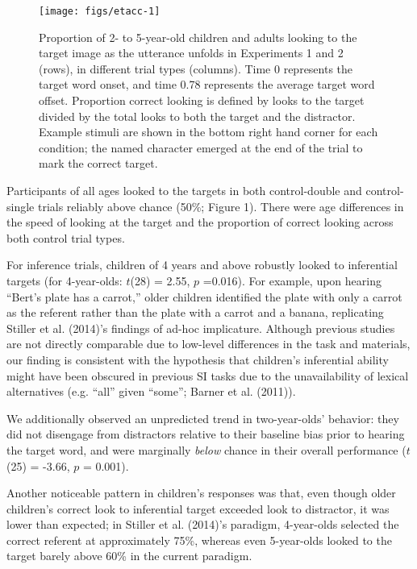 \documentclass[a4paper,man,apacite,floatsintext]{apa6}
\newenvironment{CodeChunk}{}{}
\begin{document}
\begin{CodeChunk}
\begin{figure}[H]

{\centering \texttt{[image: figs/etacc-1]} 

}

\caption[Proportion of 2- to 5-year-old children and adults looking to the target image as the utterance unfolds in Experiments 1 and 2 (rows), in different trial types (columns)]{Proportion of 2- to 5-year-old children and adults looking to the target image as the utterance unfolds in Experiments 1 and 2 (rows), in different trial types (columns). Time 0 represents the target word onset, and time 0.78 represents the average target word offset. Proportion correct looking is defined by looks to the target divided by the total looks to both the target and the distractor. Example stimuli are shown in the bottom right hand corner for each condition; the named character emerged at the end of the trial to mark the correct target.}\label{fig:etacc}
\end{figure}
\end{CodeChunk}

Participants of all ages looked to the targets in both control-double
and control-single trials reliably above chance (50\%; Figure 1). There
were age differences in the speed of looking at the target and the
proportion of correct looking across both control trial types.

For inference trials, children of 4 years and above robustly looked to
inferential targets (for 4-year-olds: \(t\)(28) = 2.55, \(p\) =0.016).
For example, upon hearing ``Bert's plate has a carrot,'' older children
identified the plate with only a carrot as the referent rather than the
plate with a carrot and a banana, replicating Stiller et al. (2014)'s
findings of ad-hoc implicature. Although previous studies are not
directly comparable due to low-level differences in the task and
materials, our finding is consistent with the hypothesis that children's
inferential ability might have been obscured in previous SI tasks due to
the unavailability of lexical alternatives (e.g. ``all'' given ``some'';
Barner et al. (2011)).

We additionally observed an unpredicted trend in two-year-olds'
behavior: they did not disengage from distractors relative to their
baseline bias prior to hearing the target word, and were marginally
\emph{below} chance in their overall performance (\(t\)(25) = -3.66,
\(p\) = 0.001).

Another noticeable pattern in children's responses was that, even though
older children's correct look to inferential target exceeded look to
distractor, it was lower than expected; in Stiller et al. (2014)'s
paradigm, 4-year-olds selected the correct referent at approximately
75\%, whereas even 5-year-olds looked to the target barely above 60\% in
the current paradigm.
\end{document}
